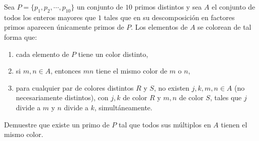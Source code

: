 Sea $P = \{ p_1, p_2, \cdots , p_{10}\}$ un conjunto de $10$ primos distintos y sea $A$ el conjunto de todos los enteros mayores que $1$ tales que en su descomposición en factores primos aparecen únicamente primos de $P$. Los elementos de $A$ se colorean de tal forma que:
\begin{enumerate}
   \item  cada elemento de $P$ tiene un color distinto,
   \item  si $m,n \in A$, entonces $mn$ tiene el mismo color de $m$ o $n$,
   \item  para cualquier par de colores distintos $R$ y $S$, no existen $j,k,m,n \in A$ (no necesariamente distintos), con $j,k$ de color $R$ y $m,n$ de color $S$, tales que $j$ divide a $m$ y $n$ divide a $k$, simultáneamente.
  \end{enumerate} 
 Demuestre que existe un primo de $P$ tal que todos sus múltiplos en $A$ tienen el mismo color.

